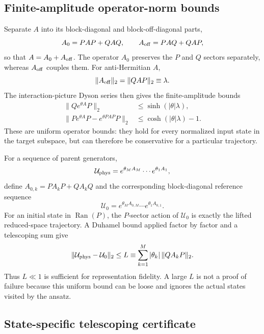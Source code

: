 \documentclass[
 aip,
 jcp,
 amsmath,amssymb,
 preprint
]{revtex4-2}
\begin{document}
\subsection{Finite-amplitude operator-norm bounds}

Separate $A$ into its block-diagonal and block-off-diagonal parts,
\begin{equation}
A_0=PAP+QAQ,\qquad
A_{\rm off}=PAQ+QAP,
\end{equation}
so that $A=A_0+A_{\rm off}$.
The operator $A_0$ preserves the $P$ and $Q$ sectors separately, whereas $A_{\rm off}$ couples them.
For anti-Hermitian $A$,
\begin{equation}
\|A_{\rm off}\|_2=\|QAP\|_2\equiv\lambda.
\end{equation}
The interaction-picture Dyson series then gives the finite-amplitude bounds
\begin{align}
\|Qe^{\theta A}P\|_2
&\le\sinh(|\theta|\lambda),\\
\|Pe^{\theta A}P-e^{\theta PAP}P\|_2
&\le\cosh(|\theta|\lambda)-1.
\end{align}
These are uniform operator bounds: they hold for every normalized input state in the target subspace, but can therefore be conservative for a particular trajectory.

For a sequence of parent generators,
\begin{equation}
\mathcal U_{\rm phys}
=
e^{\theta_MA_M}\cdots e^{\theta_1A_1},
\end{equation}
define $A_{0,k}=PA_kP+QA_kQ$ and the corresponding block-diagonal reference sequence
\begin{equation}
\mathcal U_0
=
e^{\theta_MA_{0,M}}\cdots e^{\theta_1A_{0,1}}.
\end{equation}
For an initial state in $\operatorname{Ran}(P)$, the $P$-sector action of $\mathcal U_0$ is exactly the lifted reduced-space trajectory.
A Duhamel bound applied factor by factor and a telescoping sum give
\begin{equation}
\|\mathcal U_{\rm phys}-\mathcal U_0\|_2
\le
L
\equiv
\sum_{k=1}^{M}|\theta_k|\,\|QA_kP\|_2 .
\label{eq:L}
\end{equation}
Thus $L\ll1$ is sufficient for representation fidelity.
A large $L$ is not a proof of failure because this uniform bound can be loose and ignores the actual states visited by the ansatz.

\subsection{State-specific telescoping certificate}
\end{document}
